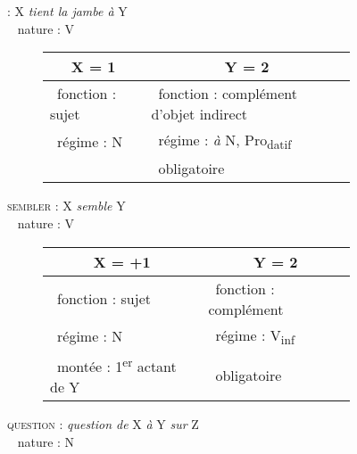 \begin{figure}[p]
	\begin{flushleft}
		 : X \textit{tient la jambe à} Y \\
		\textbullet~ nature : V
	\end{flushleft}
	\begin{subfigure}[h]{\textwidth}
		\centering
		\vspace*{-\baselineskip+5pt}
		\begin{tabularx}{\textwidth}{|X|l|}
			\hline
			\multicolumn{1}{|c|}{X = 1 } & \multicolumn{1}{c|}{Y = 2} \\
			\hline
			\textbullet~fonction : sujet & \textbullet~fonction : complément d’objet indirect \\
			\textbullet~régime : N & \textbullet~régime : \textit{à }N, Pro\textsubscript{datif}\\
			& \textbullet~obligatoire \\
			\hline
		\end{tabularx}	
	\end{subfigure}%
	\vfill
	\begin{flushleft}
		\textsc{sembler} : X \textit{semble} Y \\
		\textbullet~ nature : V
	\end{flushleft}
	\begin{subfigure}[h]{\textwidth}
		\centering
		\vspace*{-\baselineskip+5pt}
		\begin{tabularx}{\textwidth}{|X|X|}
			\hline
			\multicolumn{1}{|c|}{X = +1 } & \multicolumn{1}{c|}{Y = 2} \\
			\hline
			\textbullet~fonction : sujet & \textbullet~fonction : complément \\
			\textbullet~régime : N & \textbullet~régime : V\textsubscript{inf} \\
			\textbullet~montée : 1\textsuperscript{er} actant de Y & \textbullet~obligatoire \\
			\hline
		\end{tabularx}
	\end{subfigure}%
	\vfill
	\begin{flushleft}
		\textsc{question} : \textit{question de} X \textit{à} Y \textit{sur} Z \\
		\textbullet~ nature : N
	\end{flushleft}
	\begin{subfigure}[h]{\textwidth}
		\centering
		\vspace*{-\baselineskip+5pt}

\end{subfigure}
\end{figure}
